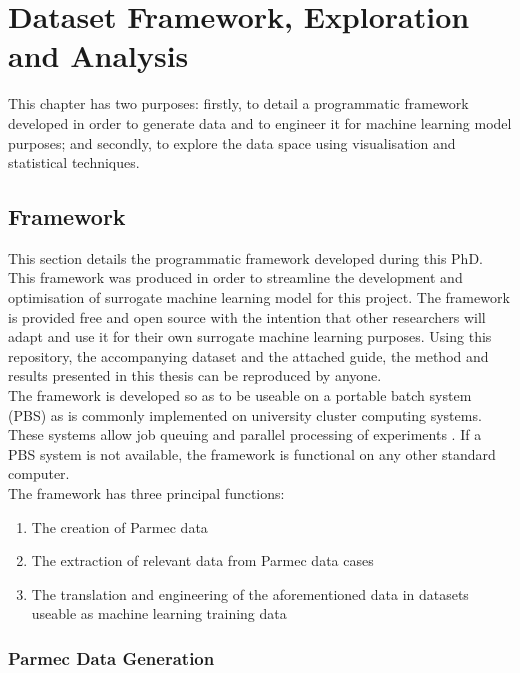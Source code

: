 \chapter{Dataset Framework, Exploration and Analysis}
\label{cha:dataset}

This chapter has two purposes: firstly, to detail a programmatic framework developed in order to generate data and to engineer it for machine learning model purposes; and secondly, to explore the data space using visualisation and statistical techniques.

\section{Framework}

This section details the programmatic framework \cite{Jones2018} developed during this PhD. This framework was produced in order to streamline the development and optimisation of surrogate machine learning model for this project. The framework is provided free and open source with the intention that other researchers will adapt and use it for their own surrogate machine learning purposes. Using this repository, the accompanying dataset \cite{huw_rhys_jones_2022_6967536} and the attached guide, the method and results presented in this thesis can be reproduced by anyone.
\\

\noindent
The framework is developed so as to be useable on a portable batch system (PBS) as is commonly implemented on university cluster computing systems. These systems allow job queuing and parallel processing of experiments \cite{henderson1995job}. If a PBS system is not available, the framework is functional on any other standard computer.
\\

\noindent
The framework has three principal functions:

\begin{enumerate}
	\item The creation of Parmec data 
	\item The extraction of relevant data from Parmec data cases
	\item The translation and engineering of the aforementioned data in datasets useable as machine learning training data 
\end{enumerate}

\subsection{Parmec Data Generation}

